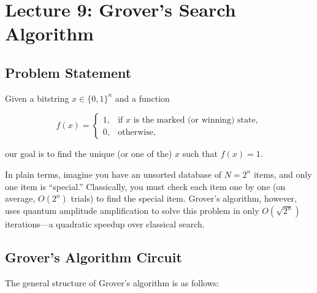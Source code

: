 \section{Lecture 9: Grover's Search Algorithm}\label{sec:lecture9}

\subsection*{Problem Statement}

Given a bitstring \( x \in \{0, 1\}^n \) and a function

\[
  f(x) =
  \begin{cases}
    1, & \text{if } x \text{ is the marked (or winning) state}, \\
    0, & \text{otherwise},
  \end{cases}
\]

our goal is to find the unique (or one of the) \( x \) such that \( f(x)=1 \).

\vspace{0.3cm}

In plain terms, imagine you have an unsorted database of \( N = 2^n \) items,
and only one item is “special.” Classically, you must check each item one by
one (on average, \( O(2^n) \) trials) to find the special item. Grover's
algorithm, however, uses quantum amplitude amplification to solve this
problem in only \( O(\sqrt{2^n}) \) iterations—a quadratic speedup over
classical search.


\subsection*{Grover's Algorithm Circuit}

The general structure of Grover's algorithm is as follows:

